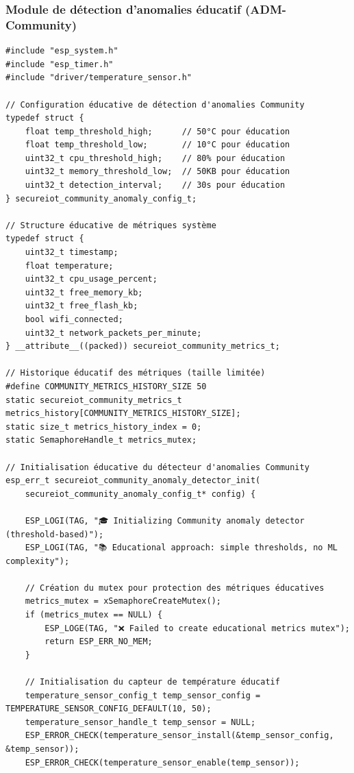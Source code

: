 \subsubsection{Module de détection d'anomalies éducatif (ADM-Community)}

\begin{lstlisting}[caption={Module éducatif de détection d'anomalies par seuils}]
#include "esp_system.h"
#include "esp_timer.h"
#include "driver/temperature_sensor.h"

// Configuration éducative de détection d'anomalies Community
typedef struct {
    float temp_threshold_high;      // 50°C pour éducation
    float temp_threshold_low;       // 10°C pour éducation
    uint32_t cpu_threshold_high;    // 80% pour éducation
    uint32_t memory_threshold_low;  // 50KB pour éducation
    uint32_t detection_interval;    // 30s pour éducation
} secureiot_community_anomaly_config_t;

// Structure éducative de métriques système
typedef struct {
    uint32_t timestamp;
    float temperature;
    uint32_t cpu_usage_percent;
    uint32_t free_memory_kb;
    uint32_t free_flash_kb;
    bool wifi_connected;
    uint32_t network_packets_per_minute;
} __attribute__((packed)) secureiot_community_metrics_t;

// Historique éducatif des métriques (taille limitée)
#define COMMUNITY_METRICS_HISTORY_SIZE 50
static secureiot_community_metrics_t metrics_history[COMMUNITY_METRICS_HISTORY_SIZE];
static size_t metrics_history_index = 0;
static SemaphoreHandle_t metrics_mutex;

// Initialisation éducative du détecteur d'anomalies Community
esp_err_t secureiot_community_anomaly_detector_init(
    secureiot_community_anomaly_config_t* config) {
    
    ESP_LOGI(TAG, "🎓 Initializing Community anomaly detector (threshold-based)");
    ESP_LOGI(TAG, "📚 Educational approach: simple thresholds, no ML complexity");
    
    // Création du mutex pour protection des métriques éducatives
    metrics_mutex = xSemaphoreCreateMutex();
    if (metrics_mutex == NULL) {
        ESP_LOGE(TAG, "❌ Failed to create educational metrics mutex");
        return ESP_ERR_NO_MEM;
    }
    
    // Initialisation du capteur de température éducatif
    temperature_sensor_config_t temp_sensor_config = TEMPERATURE_SENSOR_CONFIG_DEFAULT(10, 50);
    temperature_sensor_handle_t temp_sensor = NULL;
    ESP_ERROR_CHECK(temperature_sensor_install(&temp_sensor_config, &temp_sensor));
    ESP_ERROR_CHECK(temperature_sensor_enable(temp_sensor));
    

\end{lstlisting}
